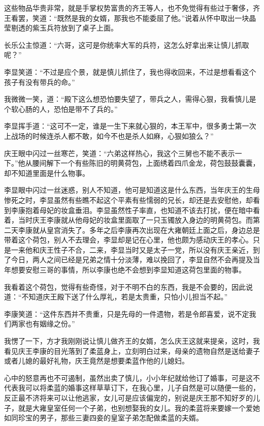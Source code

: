 这些物品华贵非常，就是手掌权势富贵的齐王等人，也不免觉得有些过于奢侈，齐王看罢，笑道：“既然是我的女婿，那我也不能委屈了他。”说着从怀中取出一块晶莹剔透的紫玉兵符放到了桌子上面。

长乐公主惊道：“六哥，这可是你统率大军的兵符，这怎么好拿出来让慎儿抓取呢？”

李显笑道：“不过是应个景，就是慎儿抓住了，我也得收回来，不过是想看看这个孩子有没有带兵的命。”

我微微一笑，道：“殿下这么想恐怕要失望了，带兵之人，需得心狠，我看慎儿是个软心肠的人，恐怕是带不了兵的。”

李显挥手道：“这可不一定，谁是一生下来就心狠的，本王军中，很多勇士第一次上战场的时候连杀人都不敢，如今不也是杀人如麻，心狠如狼么？”

庆王眼中闪过一丝寒芒，笑道：“六弟这样热心，我这个三舅也不能不表示一下。”他从腰间解下一个有些陈旧的明黄荷包，上面绣着四爪金龙，荷包鼓鼓囊囊，却不知道里面是什么物事。

李显眼中闪过一丝迷惑，别人不知道，他可是知道这是什么东西，当年庆王的生母惨死之时，李显虽然有些瞧不起这个平素有些懦弱的兄长，却还是去安慰他，却看到李康抱着母妃的妆盒垂泪。李显虽然性子率直，也知道不该去打扰，便在暗中看着，当时庆王李康就从他母妃的妆盒里面取了一只玉镯放入身边的明黄荷包。而第二天李康就从皇宫消失了。多年之后李康再次出现在大雍朝廷上面之后，身边总是带着这个荷包，别人不去理会，李显却是记在心里，他也颇为感动庆王的孝心。只是一来他和庆王性子不合，二来，李显当时又是太子一党，所以没有庆王亲近，到了今日，两人之间已经是兄弟之情十分淡薄，难以挽回了，李显自然不会再提及当年想要安慰三哥的事情，所以李康也绝不会想到李显知道这荷包里面的物事。

我看着这个荷包，觉得有些奇怪，对于不明不白的东西，我是不会要的，因此说道：“不知道庆王殿下送了什么厚礼，若是太贵重，只怕小儿担当不起。”

李康笑道：“这件东西并不贵重，只是先母的一件遗物，若是令郎喜爱，说不定我们两家也有姻缘之份。”

我愣了一下，方才我刚刚说让慎儿做齐王的女婿，怎么庆王这就来提亲，这时，我看见庆王李康的目光落到了柔蓝身上，立刻明白过来，母亲的遗物自然是送给妻子或者儿媳的最好礼物，庆王竟然是想要柔蓝作他的儿媳妇。

心中的怒意再也不可遏制，虽然出卖了慎儿，小小年纪就给他订了婚事，可是这不代表我可以将柔蓝的婚事这样草草订下，在我心里，儿子自然是可以随便一些的，反正最不济将来可以让他逃家，女儿可是应该偏宠的，别说是庆王那不知好歹的儿子，就是大雍皇室任何一个子弟，也别想娶我的女儿。我的柔蓝将来要嫁一个爱她如同珍宝的男子，那些三妻四妾的皇室子弟怎配做柔蓝的夫婿。

